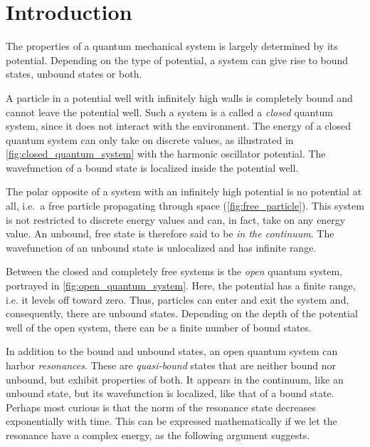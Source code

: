 \documentclass[../main/report.tex]{subfiles}
\begin{document}
\chapter{Introduction}

The properties of a quantum mechanical system is largely determined by its potential. 
Depending on the type of potential, a system can give rise to bound states, unbound states or both.

A particle in a potential well with infinitely high walls is completely bound and cannot leave the potential well.
Such a system is a called a \emph{closed} quantum system, since it does not interact with the environment. 
The energy of a closed quantum system can only take on discrete values, as illustrated in \cref{fig:closed_quantum_system} with the harmonic oscillator potential.
The wavefunction of a bound state is localized inside the potential well.

The polar opposite of a system with an infinitely high potential is no potential at all, i.e.~a free particle propagating through space (\cref{fig:free_particle}).
This system is not restricted to discrete energy values and can, in fact, take on any energy value.
An unbound, free state is therefore said to be \emph{in the continuum}.
The wavefunction of an unbound state is unlocalized and has infinite range.

Between the closed and completely free systems is the \emph{open} quantum system, portrayed in \cref{fig:open_quantum_system}. 
Here, the potential has a finite range, i.e. it levels off toward zero.
Thus, particles can enter and exit the system and, consequently, there are unbound states. 
Depending on the depth of the potential well of the open system, there can be a finite number of bound states.

In addition to the bound and unbound states, an open quantum system can harbor \emph{resonances}. 
These are \emph{quasi-bound} states that are neither bound nor unbound, but exhibit properties of both. 
It appears in the continuum, like an unbound state, but its wavefunction is localized, like that of a bound state.
Perhaps most curious is that the norm of the resonance state decreases exponentially with time. 
This can be expressed mathematically if we let the resonance have a complex energy, as the following argument suggests.
\end{document}
